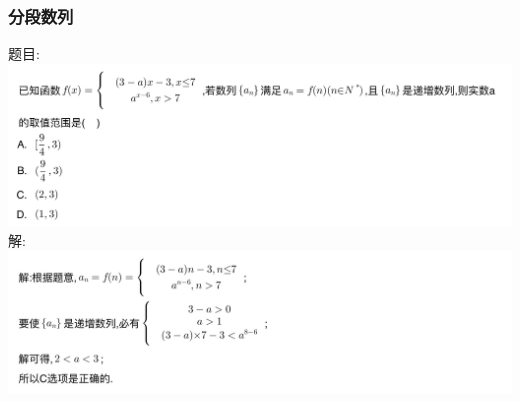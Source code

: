 \documentclass[hyperref, UTF8,11pt,a4paper]{ctexart} %
\begin{document}

\subsubsection{分段数列}
{\color{red}  题目: } \\
\includegraphics[width=500pt]  {pic/shulie/fenduanhanshutimu.jpg} \\
解: \\
\includegraphics[width=500pt]  {pic/shulie/fenduanhanshudaan.jpg} \\

\end{document}

